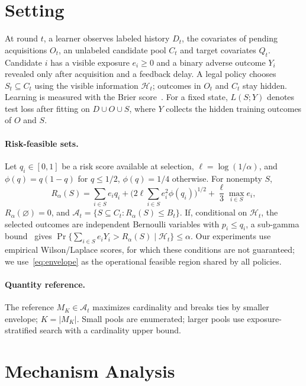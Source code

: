 \documentclass[runningheads]{llncs}
\begin{document}
\section{Setting}
\label{sec:setting}
At round $t$, a learner observes labeled history $D_t$, the covariates of pending acquisitions $O_t$, an unlabeled candidate pool $C_t$ and target covariates $Q_t$. Candidate $i$ has a visible exposure $e_i\geq0$ and a binary adverse outcome $Y_i$ revealed only after acquisition and a feedback delay. A legal policy chooses $S_t\subseteq C_t$ using the visible information $\mathcal H_t$; outcomes in $O_t$ and $C_t$ stay hidden. Learning is measured with the Brier score~\cite{brier1950verification}. For a fixed state, $L(S;Y)$ denotes test loss after fitting on $D\cup O\cup S$, where $Y$ collects the hidden training outcomes of $O$ and $S$.

\paragraph{Risk-feasible sets.} Let $q_i\in[0,1]$ be a risk score available at selection, $\ell=\log(1/\alpha)$, and $\phi(q)=q(1-q)$ for $q\le1/2$, $\phi(q)=1/4$ otherwise. For nonempty $S$,
\begin{equation}
 R_\alpha(S)=\sum_{i\in S}e_iq_i+\Big(2\ell\sum_{i\in S}e_i^2\phi(q_i)\Big)^{1/2}+\frac{\ell}{3}\max_{i\in S}e_i,
 \label{eq:envelope}
\end{equation}
$R_\alpha(\varnothing)=0$, and $\mathcal A_t=\{S\subseteq C_t:R_\alpha(S)\le B_t\}$. If, conditional on $\mathcal H_t$, the selected outcomes are independent Bernoulli variables with $p_i\le q_i$, a sub-gamma bound~\cite{boucheron2013concentration} gives $\Pr\{\sum_{i\in S}e_iY_i>R_\alpha(S)\mid\mathcal H_t\}\le\alpha$. Our experiments use empirical Wilson/Laplace scores, for which these conditions are not guaranteed; we use~\eqref{eq:envelope} as the operational feasible region shared by all policies.

\paragraph{Quantity reference.} The reference $M_K\in\mathcal A_t$ maximizes cardinality and breaks ties by smaller envelope; $K=|M_K|$. Small pools are enumerated; larger pools use exposure-stratified search with a cardinality upper bound.

\section{Mechanism Analysis}
\label{sec:mechanism}
\end{document}
